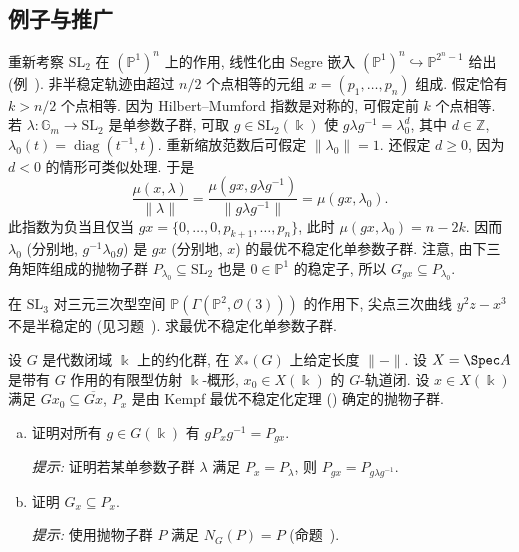 \subsection{例子与推广}\label{src:8.6.4-subsection}
\begin{example}\label{src:8.6.11}
重新考察 $\mathrm{SL}_2$ 在 $(\mathbb P^1)^n$ 上的作用, 线性化由 Segre 嵌入 $(\mathbb P^1)^n\hookrightarrow\mathbb P^{2^n-1}$ 给出 (例~). 非半稳定轨迹由超过 $n/2$ 个点相等的元组 $x=(p_1,\ldots,p_n)$ 组成. 假定恰有 $k>n/2$ 个点相等. 因为 Hilbert--Mumford 指数是对称的, 可假定前 $k$ 个点相等. 若 $\lambda:\mathbb G_m\to\mathrm{SL}_2$ 是单参数子群, 可取 $g\in\mathrm{SL}_2(\Bbbk)$ 使 $g\lambda g^{-1}=\lambda_0^d$, 其中 $d\in\mathbb Z$, $\lambda_0(t)=\operatorname{diag}(t^{-1},t)$. 重新缩放范数后可假定 $\|\lambda_0\|=1$. 还假定 $d\geq0$, 因为 $d<0$ 的情形可类似处理. 于是
\[
\frac{\mu(x,\lambda)}{\|\lambda\|}=\frac{\mu(gx,g\lambda g^{-1})}{\|g\lambda g^{-1}\|}=\mu(gx,\lambda_0).
\]
此指数为负当且仅当 $gx=\{0,\ldots,0,p_{k+1},\ldots,p_n\}$, 此时 $\mu(gx,\lambda_0)=n-2k$. 因而 $\lambda_0$ (分别地, $g^{-1}\lambda_0g$) 是 $gx$ (分别地, $x$) 的最优不稳定化单参数子群. 注意, 由下三角矩阵组成的抛物子群 $P_{\lambda_0}\subseteq\mathrm{SL}_2$ 也是 $0\in\mathbb P^1$ 的稳定子, 所以 $G_{gx}\subseteq P_{\lambda_0}$.
\end{example}
\begin{exercise}\label{src:8.6.12}
在 $\mathrm{SL}_3$ 对三元三次型空间 $\mathbb P(\Gamma(\mathbb P^2,\mathcal O(3)))$ 的作用下, 尖点三次曲线 $y^2z-x^3$ 不是半稳定的 (见习题~). 求最优不稳定化单参数子群.
\end{exercise}
\begin{exercise}\label{src:8.6.13}
设 $G$ 是代数闭域 $\Bbbk$ 上的约化群, 在 $\mathbb X_*(G)$ 上给定长度 $\|{-}\|$. 设 $X=\Spec A$ 是带有 $G$ 作用的有限型仿射 $\Bbbk$-概形, $x_0\in X(\Bbbk)$ 的 $G$-轨道闭. 设 $x\in X(\Bbbk)$ 满足 $Gx_0\subseteq\overline{Gx}$, $P_x$ 是由 Kempf 最优不稳定化定理 () 确定的抛物子群.
\begin{enumerate}[(a)]
\item 证明对所有 $g\in G(\Bbbk)$ 有 $gP_xg^{-1}=P_{gx}$.

\textit{提示:} 证明若某单参数子群 $\lambda$ 满足 $P_x=P_\lambda$, 则 $P_{gx}=P_{g\lambda g^{-1}}$.
\item 证明 $G_x\subseteq P_x$.

\textit{提示:} 使用抛物子群 $P$ 满足 $N_G(P)=P$ (命题~).
\end{enumerate}
\end{exercise}
